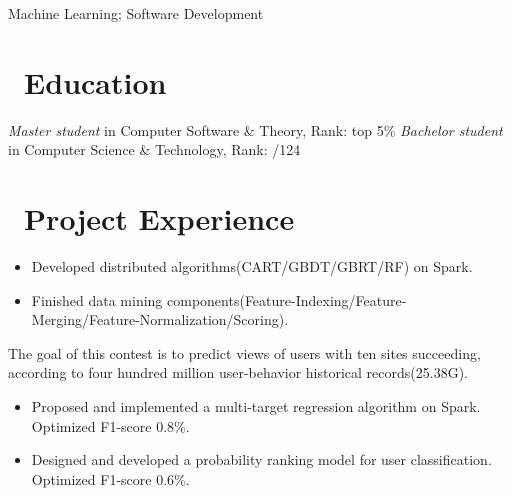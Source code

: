 \documentclass{resume}
\begin{document}


\centerline{Machine Learning; Software Development}
\vspace{2ex}

 
\section{\faGraduationCap\ Education}
\textit{Master student} in Computer Software \& Theory, Rank: top 5\%
\textit{Bachelor student} in Computer Science \& Technology, Rank: /124

\section{\faUsers\ Project Experience}
\begin{itemize}
  \item  Developed distributed algorithms(CART/GBDT/GBRT/RF) on Spark.
  \item Finished data mining components(Feature-Indexing/Feature-Merging/Feature-Normalization/Scoring).
\end{itemize}

The goal of this contest is to predict views of users with ten sites succeeding, according to four hundred million user-behavior historical records(25.38G).
\begin{itemize}
  \item Proposed and implemented a multi-target regression algorithm on Spark. Optimized F1-score 0.8\%.
  \item Designed and developed a probability ranking model for user classification. Optimized F1-score  0.6\%.
\end{itemize}
\end{document}
